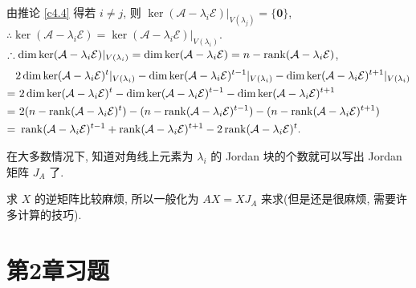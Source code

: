 \documentclass[color=black,device=normal,lang=cn,mode=geye]{elegantnote}
\begin{document}
由推论 \ref{c4.4} 得若 $i\neq j$, 则 $\ker(\mathcal{A}-\lambda_i\mathcal{E})|_{V(\lambda_j)}=\{\boldsymbol{0}\}$, $\therefore\ker(\mathcal{A}-\lambda_i\mathcal{E})=\ker(\mathcal{A}-\lambda_i\mathcal{E})|_{V(\lambda_i)}$. $\therefore\dim\ker(\mathcal{A}-\lambda_i\mathcal{E})|_{V(\lambda_i)}=\dim\ker(\mathcal{A}-\lambda_i\mathcal{E})=n-\operatorname{rank} (\mathcal{A}-\lambda_i\mathcal{E})$,
\begin{align*}
    & 2\dim\ker(\mathcal{A}-\lambda_i\mathcal{E})^t|_{V(\lambda_i)}-\dim\ker(\mathcal{A}-\lambda_i\mathcal{E})^{t-1}|_{V(\lambda_i)}-\dim\ker(\mathcal{A}-\lambda_i\mathcal{E})^{t+1}|_{V(\lambda_i)} \\
    = &\ 2\dim\ker(\mathcal{A}-\lambda_i\mathcal{E})^t-\dim\ker(\mathcal{A}-\lambda_i\mathcal{E})^{t-1}-\dim\ker(\mathcal{A}-\lambda_i\mathcal{E})^{t+1} \\
    = &\ 2(n-\rank (\mathcal{A}-\lambda_i\mathcal{E})^t)-(n-\rank (\mathcal{A}-\lambda_i\mathcal{E})^{t-1})-(n-\rank (\mathcal{A}-\lambda_i\mathcal{E})^{t+1}) \\
    = &\ \rank (\mathcal{A}-\lambda_i\mathcal{E})^{t-1}+\rank (\mathcal{A}-\lambda_i\mathcal{E})^{t+1}-2\rank (\mathcal{A}-\lambda_i\mathcal{E})^t.
\end{align*}

在大多数情况下, 知道对角线上元素为 $\lambda_i$ 的 Jordan 块的个数就可以写出 Jordan 矩阵 $J_A$ 了.

求 $X$ 的逆矩阵比较麻烦, 所以一般化为 $AX=XJ_A$ 来求(但是还是很麻烦, 需要许多计算的技巧).
\section{第2章习题}
\end{document}
